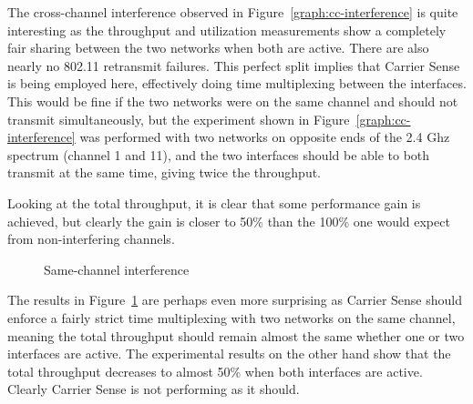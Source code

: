 The cross-channel interference observed in Figure~\ref{graph:cc-interference} is
quite interesting as the throughput and utilization measurements show a
completely fair sharing between the two networks when both are active. There are
also nearly no 802.11 retransmit failures. This perfect split implies that
Carrier Sense is being employed here, effectively doing time multiplexing
between the interfaces.  This would be fine if the two networks were on the same
channel and should not transmit simultaneously, but the experiment shown in
Figure~\ref{graph:cc-interference} was performed with two networks on opposite
ends of the 2.4 Ghz spectrum (channel 1 and 11), and the two interfaces should
be able to both transmit at the same time, giving twice the throughput.

Looking at the total throughput, it is clear that some performance gain is
achieved, but clearly the gain is closer to 50\% than the 100\% one would expect
from non-interfering channels.

\begin{figure}[h]
 \centering
 
 \caption{Same-channel interference}\label{graph:sc-interference}
\end{figure}

The results in Figure~\ref{graph:sc-interference} are perhaps even more
surprising as Carrier Sense should enforce a fairly strict time multiplexing
with two networks on the same channel, meaning the total throughput should
remain almost the same whether one or two interfaces are active. The
experimental results on the other hand show that the total throughput decreases
to almost 50\% when both interfaces are active. Clearly Carrier Sense is not
performing as it should.
